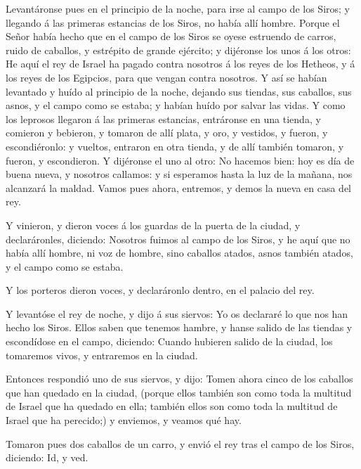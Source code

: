  Levantáronse pues en el principio de la noche, para irse al
campo de los Siros; y llegando á las primeras estancias de los Siros, no
había allí hombre.  Porque el Señor había hecho que en el
campo de los Siros se oyese estruendo de carros, ruido de caballos, y
estrépito de grande ejército; y dijéronse los unos á los otros: He aquí
el rey de Israel ha pagado contra nosotros á los reyes de los Hetheos, y
á los reyes de los Egipcios, para que vengan contra nosotros.
 Y así se habían levantado y huído al principio de la noche,
dejando sus tiendas, sus caballos, sus asnos, y el campo como se estaba;
y habían huído por salvar las vidas.  Y como los leprosos
llegaron á las primeras estancias, entráronse en una tienda, y comieron
y bebieron, y tomaron de allí plata, y oro, y vestidos, y fueron, y
escondiéronlo: y vueltos, entraron en otra tienda, y de allí también
tomaron, y fueron, y escondieron.  Y dijéronse el uno al
otro: No hacemos bien: hoy es día de buena nueva, y nosotros callamos: y
si esperamos hasta la luz de la mañana, nos alcanzará la maldad. Vamos
pues ahora, entremos, y demos la nueva en casa del rey.

 Y vinieron, y dieron voces á los guardas de la puerta de
la ciudad, y declaráronles, diciendo: Nosotros fuimos al campo de los
Siros, y he aquí que no había allí hombre, ni voz de hombre, sino
caballos atados, asnos también atados, y el campo como se estaba.

 Y los porteros dieron voces, y declaráronlo dentro, en el
palacio del rey.

 Y levantóse el rey de noche, y dijo á sus siervos: Yo os
declararé lo que nos han hecho los Siros. Ellos saben que tenemos
hambre, y hanse salido de las tiendas y escondídose en el campo,
diciendo: Cuando hubieren salido de la ciudad, los tomaremos vivos, y
entraremos en la ciudad.

 Entonces respondió uno de sus siervos, y dijo: Tomen ahora
cinco de los caballos que han quedado en la ciudad, (porque ellos
también son como toda la multitud de Israel que ha quedado en ella;
también ellos son como toda la multitud de Israel que ha perecido;) y
enviemos, y veamos qué hay.

 Tomaron pues dos caballos de un carro, y envió el rey tras
el campo de los Siros, diciendo: Id, y ved.

